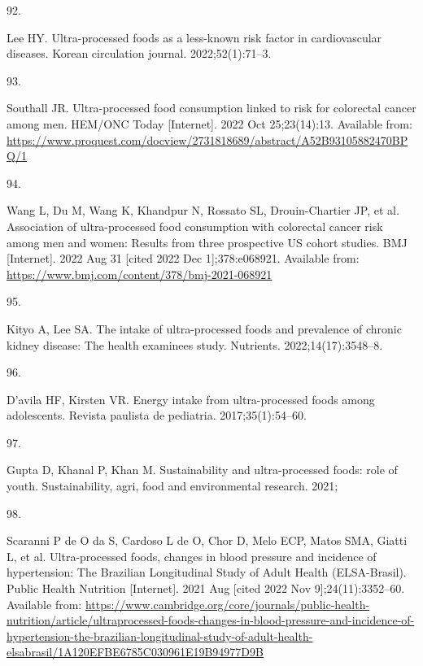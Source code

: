 \documentclass[
]{article}
\newlength{\cslhangindent}
\newlength{\csllabelwidth}
\newlength{\cslentryspacingunit} %
\newenvironment{CSLReferences}[2] %
 {%
  \setlength{\parindent}{0pt}
  \ifodd #1
  \let\oldpar\par
  \def\par{\hangindent=\cslhangindent\oldpar}
  \fi
  \setlength{\parskip}{#2\cslentryspacingunit}
 }%
 {}
\newcommand{\CSLLeftMargin}[1]{\parbox[t]{\csllabelwidth}{#1}}
\newcommand{\CSLRightInline}[1]{\parbox[t]{\linewidth - \csllabelwidth}{#1}\break}
\begin{document}
\begin{CSLReferences}{0}{0}
\leavevmode{}%
\CSLLeftMargin{92. }%
\CSLRightInline{Lee HY. Ultra-processed foods as a less-known risk
factor in cardiovascular diseases. Korean circulation journal.
2022;52(1):71--3. }

\leavevmode{}%
\CSLLeftMargin{93. }%
\CSLRightInline{Southall JR. Ultra-processed food consumption linked to
risk for colorectal cancer among men. HEM/ONC Today {[}Internet{]}. 2022
Oct 25;23(14):13. Available from:
\url{https://www.proquest.com/docview/2731818689/abstract/A52B93105882470BPQ/1}}

\leavevmode{}%
\CSLLeftMargin{94. }%
\CSLRightInline{Wang L, Du M, Wang K, Khandpur N, Rossato SL,
Drouin-Chartier JP, et al. Association of ultra-processed food
consumption with colorectal cancer risk among men and women: Results
from three prospective {US} cohort studies. BMJ {[}Internet{]}. 2022 Aug
31 {[}cited 2022 Dec 1{]};378:e068921. Available from:
\url{https://www.bmj.com/content/378/bmj-2021-068921}}

\leavevmode{}%
\CSLLeftMargin{95. }%
\CSLRightInline{Kityo A, Lee SA. The intake of ultra-processed foods and
prevalence of chronic kidney disease: The health examinees study.
Nutrients. 2022;14(17):3548--8. }

\leavevmode{}%
\CSLLeftMargin{96. }%
\CSLRightInline{D'avila HF, Kirsten VR. Energy intake from
ultra-processed foods among adolescents. Revista paulista de pediatria.
2017;35(1):54--60. }

\leavevmode{}%
\CSLLeftMargin{97. }%
\CSLRightInline{Gupta D, Khanal P, Khan M. Sustainability and
ultra-processed foods: role of youth. Sustainability, agri, food and
environmental research. 2021; }

\leavevmode{}%
\CSLLeftMargin{98. }%
\CSLRightInline{Scaranni P de O da S, Cardoso L de O, Chor D, Melo ECP,
Matos SMA, Giatti L, et al. Ultra-processed foods, changes in blood
pressure and incidence of hypertension: The {Brazilian Longitudinal
Study} of {Adult Health} ({ELSA-Brasil}). Public Health Nutrition
{[}Internet{]}. 2021 Aug {[}cited 2022 Nov 9{]};24(11):3352--60.
Available from:
\url{https://www.cambridge.org/core/journals/public-health-nutrition/article/ultraprocessed-foods-changes-in-blood-pressure-and-incidence-of-hypertension-the-brazilian-longitudinal-study-of-adult-health-elsabrasil/1A120EFBE6785C030961E19B94977D9B}}


\end{CSLReferences}
\end{document}

